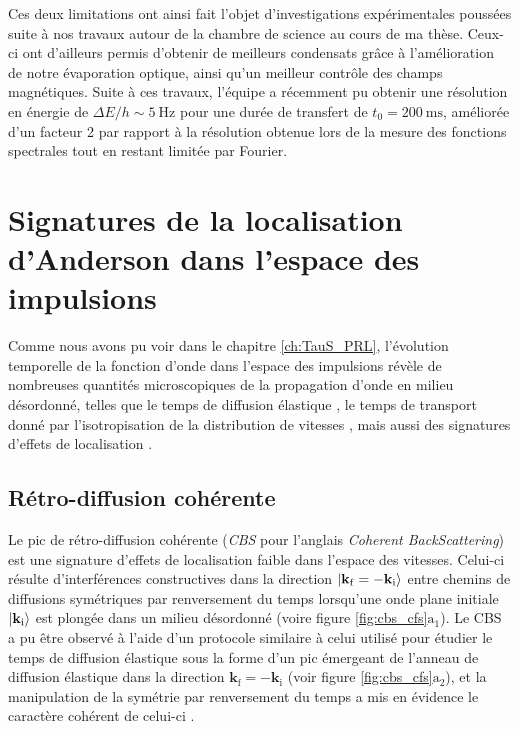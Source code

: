 Ces deux limitations ont ainsi fait l'objet d'investigations expérimentales poussées suite à nos travaux autour de la chambre de science au cours de ma thèse. Ceux-ci ont d'ailleurs permis d'obtenir de meilleurs condensats grâce à l'amélioration de notre évaporation optique, ainsi qu'un meilleur contrôle des champs magnétiques. Suite à ces travaux, l'équipe a récemment pu obtenir une résolution en énergie de $\Delta E/h\sim\SI{5}{\hertz}$ pour une durée de transfert de $t_0=\SI{200}{\milli\second}$, améliorée d'un facteur 2 par rapport à la résolution obtenue lors de la mesure des fonctions spectrales tout en restant limitée par Fourier. 







\section{Signatures de la localisation d'Anderson dans l'espace des impulsions}
Comme nous avons pu voir dans le chapitre \ref{ch:TauS_PRL}, l'évolution temporelle de la fonction d'onde dans l'espace des impulsions révèle de nombreuses quantités microscopiques de la propagation d'onde en milieu désordonné, telles que le temps de diffusion élastique \citep{richard2019elastic}, le temps de transport donné par l'isotropisation de la distribution de vitesses \citep{plisson2013momentum}, mais aussi des signatures d'effets de localisation \citep{cherroret2012coherent}.

\subsection{Rétro-diffusion cohérente}
Le pic de rétro-diffusion cohérente (\emph{CBS} pour l'anglais \emph{Coherent BackScattering}) est une signature d'effets de localisation faible dans l'espace des vitesses. Celui-ci résulte d'interférences constructives dans la direction $\left| \mathbf{k}_{\mathrm{f}}=-\mathbf{k}_{\mathrm{i}} \right\rangle$ entre chemins de diffusions symétriques par renversement du temps lorsqu'une onde plane initiale $\left| \mathbf{k}_{\mathrm{i}} \right\rangle$ est plongée dans un milieu désordonné (voire figure \ref{fig:cbs_cfs}$\mathrm{a_1}$). Le CBS a pu être observé à l'aide d'un protocole similaire à celui utilisé pour étudier le temps de diffusion élastique \citep{jendrzejewski2012coherent} sous la forme d'un pic émergeant de l'anneau de diffusion élastique dans la direction $\mathbf{k}_{\mathrm{f}}=-\mathbf{k}_{\mathrm{i}}$ (voir figure \ref{fig:cbs_cfs}$\mathrm{a_2}$), et la manipulation de la symétrie par renversement du temps a mis en évidence le caractère cohérent de celui-ci \citep{muller2015suppression}.

